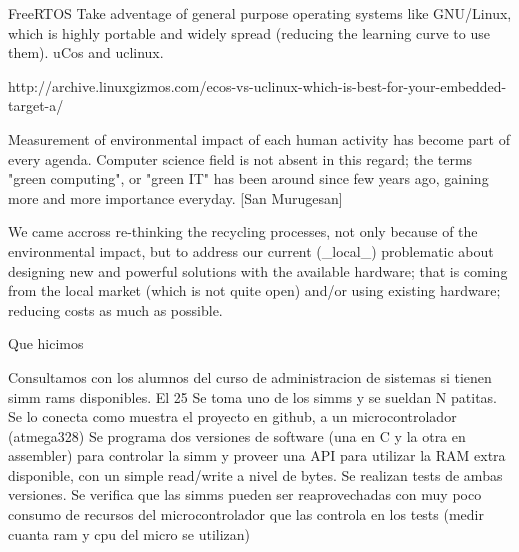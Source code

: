 FreeRTOS 
Take adventage of general purpose operating systems like GNU/Linux, which is highly portable and widely spread (reducing the learning curve to use them). uCos and uclinux.  

http://archive.linuxgizmos.com/ecos-vs-uclinux-which-is-best-for-your-embedded-target-a/


Measurement of environmental impact of each human activity has become part of 
every agenda. Computer science field is not absent in this regard; the terms 
"green computing", or "green IT" has been around since few years ago, gaining
 more and more importance everyday. [San Murugesan]

We came accross re-thinking the recycling processes, not only because of the 
environmental impact, but to address our current (_local_) problematic about
designing new and powerful solutions with the available hardware; that is 
coming from the local market (which is not quite open) and/or using existing 
hardware; reducing costs as much as possible. 


 
Que hicimos

Consultamos con los alumnos del curso de administracion de sistemas si tienen
simm rams disponibles.
El 25%
Se toma uno de los simms y se sueldan N patitas.
Se lo conecta como muestra el proyecto en github, a un microcontrolador (atmega328)
Se programa dos versiones de software (una en C y la otra en assembler)
para controlar la simm y proveer
una API para utilizar la RAM extra disponible, con un simple read/write a
nivel de bytes.
Se realizan tests de ambas versiones.
Se verifica que las simms pueden ser reaprovechadas con muy poco consumo
de recursos del microcontrolador que las controla en los tests (medir cuanta
ram y cpu del micro se utilizan)

